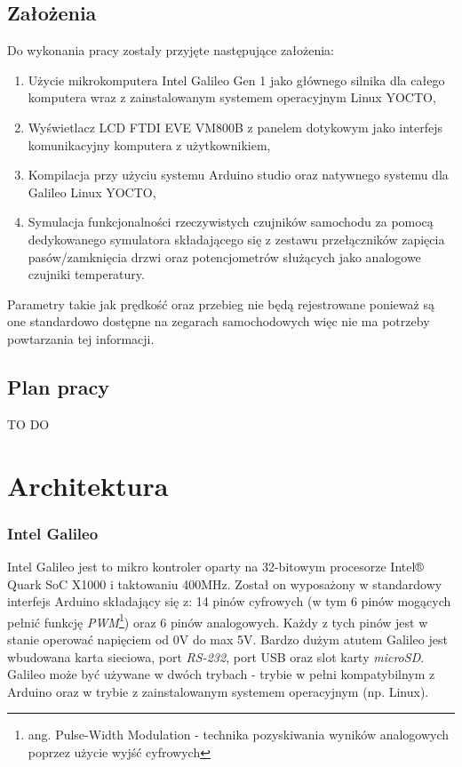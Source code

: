 \documentclass{xmgr}
\begin{document}
\section{Założenia}
Do wykonania pracy zostały przyjęte następujące założenia:
\begin{enumerate}
\item Użycie mikrokomputera Intel Galileo Gen 1 jako głównego silnika dla całego komputera wraz z zainstalowanym systemem operacyjnym Linux YOCTO, 
\item Wyświetlacz LCD FTDI EVE VM800B z panelem dotykowym jako interfejs komunikacyjny komputera z użytkownikiem, 
\item Kompilacja przy użyciu systemu Arduino studio oraz natywnego systemu dla Galileo Linux YOCTO,
\item Symulacja funkcjonalności rzeczywistych czujników samochodu za pomocą dedykowanego symulatora składającego się z zestawu przełączników zapięcia pasów/zamknięcia drzwi oraz potencjometrów służących jako analogowe czujniki temperatury.
\end{enumerate}

Parametry takie jak prędkość oraz przebieg nie będą rejestrowane ponieważ są one standardowo dostępne na zegarach samochodowych więc nie ma potrzeby powtarzania tej informacji.

\section{Plan pracy}
TO DO


\chapter{Architektura}
\subsection{Intel Galileo}
Intel Galileo jest  to mikro kontroler oparty na 32-bitowym procesorze Intel® Quark SoC X1000 i taktowaniu 400MHz. Został on wyposażony w standardowy interfejs Arduino składający się z: 14 pinów cyfrowych (w tym 6 pinów mogących pełnić funkcję \emph{PWM}\footnote{ang. Pulse-Width Modulation - technika pozyskiwania wyników analogowych poprzez użycie wyjść cyfrowych}) oraz 6 pinów analogowych. Każdy z tych pinów jest w stanie operować napięciem od 0V do max 5V. Bardzo dużym atutem Galileo jest wbudowana karta sieciowa, port \emph{RS-232}, port USB oraz slot karty \emph{microSD}. Galileo może być używane w dwóch trybach - trybie w pełni kompatybilnym z Arduino oraz w trybie z zainstalowanym systemem operacyjnym (np. Linux).\cite{GalileoBook}
\end{document}
